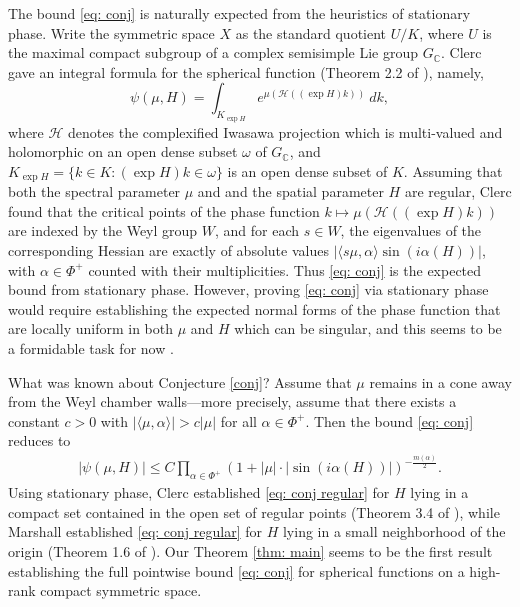 \documentclass{amsart}
\numberwithin{equation}{section}
\numberwithin{equation}{section}
\begin{document}
The bound \eqref{eq: conj} is naturally expected from the heuristics of stationary phase. Write the symmetric space $X$ as the standard quotient $U/K$, where  
$U$ is the maximal compact subgroup of a complex semisimple Lie group $G_\mathbb{C}$. 
Clerc gave an integral formula for the spherical function (Theorem 2.2 of \cite{Cle88}), namely,
$$\psi(\mu,H)= \int_{K_{\exp H}} e^{\mu(\mathcal{H}((\exp H) k))}\ dk,$$
where $\mathcal{H}$ denotes the complexified Iwasawa projection which is multi-valued and holomorphic on an open dense subset $\omega$ of $G_\mathbb{C}$, 
and $K_{\exp H}=\{k\in K: (\exp H) k\in\omega\}$ is an open dense subset of $K$. 
Assuming that both the spectral parameter $\mu$ and and the spatial parameter $H$ are regular, 
Clerc found that the critical points of the phase function $k\mapsto \mu(\mathcal{H}((\exp H) k))$ are indexed by the Weyl group $W$, and for each $s\in W$, the eigenvalues of the corresponding Hessian are exactly of absolute values  
$\left|\langle s\mu,\alpha\rangle\sin\left(i\alpha( H)\right)\right|$, with $\alpha\in\Phi^+$ counted with their multiplicities. Thus \eqref{eq: conj} is the expected bound from stationary phase. However, proving \eqref{eq: conj} via stationary phase would require establishing the expected normal forms of the phase function that are locally uniform in both $\mu$ and $H$ which can be singular, and this seems to be a formidable task for now \cite{DKV83, BP16, Mar16, Li25}. 

What was known about Conjecture \ref{conj}? 
Assume that $\mu$ remains in a cone away from the Weyl chamber walls---more precisely, assume that there exists a constant $c>0$ with $|\langle\mu,\alpha\rangle|> c|\mu|$ for all $\alpha\in\Phi^+$. Then the bound \eqref{eq: conj} reduces to 
\begin{align} \label{eq: conj regular}
    |\psi(\mu, H)|\leq C\prod_{\alpha\in\Phi^+}\left(1+ |\mu|\cdot \left|\sin\left(i\alpha( H)\right)\right|\right)^{-\frac{m(\alpha)}{2}}.
\end{align}
Using stationary phase, 
Clerc established \eqref{eq: conj regular} for $H$ lying in a compact set contained in the open set of regular points (Theorem 3.4 of \cite{Cle88}), while Marshall established \eqref{eq: conj regular}  for $H$ lying in a small neighborhood of the origin (Theorem 1.6 of \cite{Mar16}). 
Our 
Theorem \ref{thm: main} seems to be the first result establishing the full pointwise bound \eqref{eq: conj} for spherical functions on a high-rank compact symmetric space. 
\end{document}
